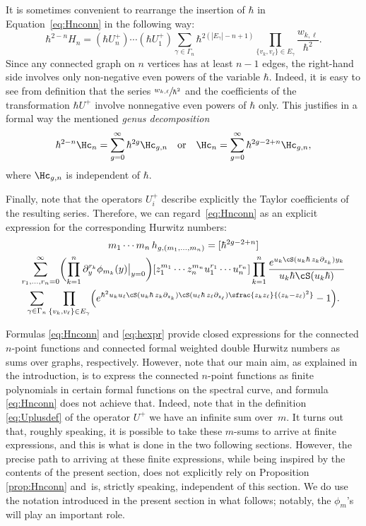 It is sometimes convenient to rearrange the insertion of $\hbar$ in Equation~\eqref{eq:Hnconn} in the following way:
\begin{equation*}
\hbar^{2-n}H_n=
(\hbar U^+_n)\cdots(\hbar U^+_1)
\sum_{\gamma \in \Gamma_n}\hbar^{2(|E_\gamma|-n+1)}\prod_{\{v_k,v_\ell\}\in E_\gamma}
\frac{w_{k,\ell}}{\hbar^2}.
\end{equation*}
Since any connected graph on $n$ vertices has at least $n-1$ edges, the right-hand side involves only non-negative even powers of the variable $\hbar$. Indeed, it is easy to see from definition that the series $\sfrac{w_{k,\ell}}{\hbar^2}$ and the coefficients of the transformation $\hbar U^+$ involve nonnegative even powers of $\hbar$ only. This justifies in a formal way the mentioned \emph{genus decomposition}
\begin{equation*}\label{eq:Hgndef}
\hbar^{2-n}\Hc_n=\sum_{g=0}^\infty\hbar^{2g}\Hc_{g,n}
\quad\text{or}\quad
\Hc_n=\sum_{g=0}^\infty\hbar^{2g-2+n}\Hc_{g,n},
\end{equation*}
where $\Hc_{g,n}$ is independent of $\hbar$.

Finally, note that the operators $U^+_i$ describe explicitly the Taylor coefficients of the resulting series. Therefore, we can regard~\eqref{eq:Hnconn} as an explicit expression for the corresponding Hurwitz numbers:
\begin{multline}\label{eq:hexpr}
m_1\cdots m_n\,h_{g,(m_1,\dots,m_n)}
=[\hbar^{2g-2+n}]\\
\sum_{r_1,\dots,r_n=0}^\infty
\biggl(\prod_{k=1}^n\partial_y^{r_k}\phi_{m_k}(y)\big|_{y=0}\biggr) [z_1^{m_1}\cdots z_n^{m_n}u_1^{r_1}\cdots u_n^{r_n}]
\prod_{k=1}^n \frac{e^{ u_k\cS(u_k\hbar\,z_k\partial_{z_k})y_k }}
{u_k\hbar\cS(u_k\hbar)}\\
\sum_{\gamma\in\Gamma_n} \prod_{\{v_k,v_\ell\}\in E_\gamma}
\Bigl(e^{\hbar^2u_ku_\ell\cS(u_k\hbar\,z_k\partial_{z_k})\cS(u_\ell\hbar\,z_\ell\partial_{z_\ell})
\sfrac{z_k z_\ell}{(z_k-z_\ell)^2}}-1\Bigr).
\end{multline}

\begin{remark}
Formulas \eqref{eq:Hnconn} and \eqref{eq:hexpr} provide closed expressions for the connected $n$-point functions and connected formal weighted double Hurwitz numbers as sums over graphs, respectively. However, note that our main aim, as explained in the introduction, is to express the connected $n$-point functions as finite polynomials in certain formal functions on the spectral curve, and formula \eqref{eq:Hnconn} does not achieve that. Indeed, note that in the definition \eqref{eq:Uplusdef} of the operator $U^+$ we have an infinite sum over~$m$. It turns out that, roughly speaking, it is possible to
take these $m$-sums to arrive at finite expressions, and this is what is done in the two following sections. However, the precise path to arriving at these finite expressions, while being inspired by the contents of the present section, does not explicitly rely on Proposition \ref{prop:Hnconn} and~is, strictly speaking, independent of this section. We do use the notation introduced in the present section in what follows; notably, the $\phi_m$'s will play an important role.
\end{remark}

